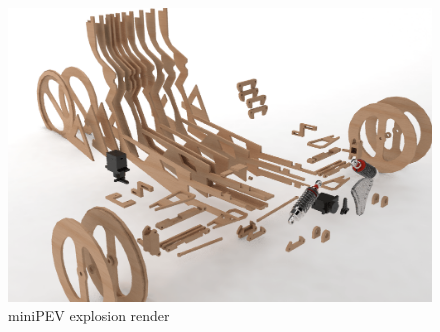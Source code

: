 \begin{figure}[h!]
	\includegraphics[width=0.95\linewidth]{figs/04/CreamBoxtemp0150}
	\caption{miniPEV explosion render}
\end{figure}
